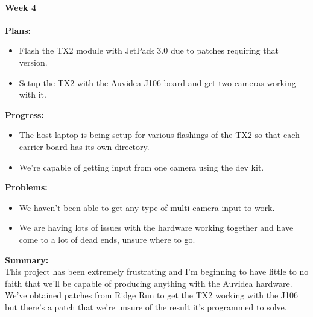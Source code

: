 \paragraph{Week 4}
\begin{adjustwidth}{2.5em}{0pt}
    \vspace{-0.5cm}\textbf{Plans:}
    \vspace{-0.5cm}
    \begin{itemize}
        \item Flash the TX2 module with JetPack 3.0 due to patches requiring that version.
		\item Setup the TX2 with the Auvidea J106 board and get two cameras working with it.  
    \end{itemize} 
    \vspace{-0.3cm}\textbf{Progress:}
    \vspace{-0.5cm}
    \begin{itemize}
        \item The host laptop is being setup for various flashings of the TX2 so that each carrier board has its own directory. 
		\item We're capable of getting input from one camera using the dev kit.  
    \end{itemize} 
    \vspace{-0.3cm}\textbf{Problems:}
    \vspace{-0.5cm}
    \begin{itemize}
        \item We haven't been able to get any type of multi-camera input to work. 
		\item We are having lots of issues with the hardware working together and have come to a lot of dead ends, unsure where to go.  
    \end{itemize}  
    \vspace{-0.3cm}\noindent\textbf{Summary:}\\
    \noindent This project has been extremely frustrating and I'm beginning to have little to no faith that we'll be capable of producing anything with the Auvidea hardware. We've obtained patches from Ridge Run to get the TX2 working with the J106 but there's a patch that we're unsure of the result it's programmed to solve. 
\end{adjustwidth} 

